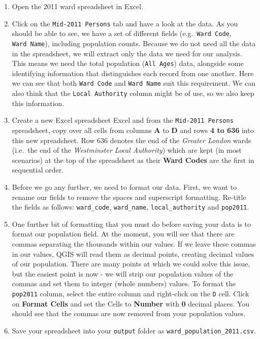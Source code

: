 \documentclass[
]{book}
\providecommand{\tightlist}{%
  \setlength{\itemsep}{0pt}\setlength{\parskip}{0pt}}
\begin{document}
\begin{enumerate}
\def\labelenumi{\arabic{enumi}.}
\tightlist
\item
  Open the 2011 ward spreadsheet in Excel.
\item
  Click on the \texttt{Mid-2011\ Persons} tab and have a look at the data. As you should be able to see, we have a set of different fields (e.g.~\texttt{Ward\ Code}, \texttt{Ward\ Name}), including population counts. Because we do not need all the data in the spreadsheet, we will extract only the data we need for our analysis. This means we need the total population (\texttt{All\ Ages}) data, alongside some identifying information that distinguishes each record from one another. Here we can see that both \texttt{Ward\ Code} and \texttt{Ward\ Name} suit this requirement. We can also think that the \texttt{Local\ Authority} column might be of use, so we also keep this information.
\item
  Create a new Excel spreadsheet Excel and from the \texttt{Mid-2011\ Persons} spreadsheet, copy over all cells from columns \textbf{A} to \textbf{D} and rows \textbf{4 to 636} into this new spreadsheet. Row 636 denotes the end of the \emph{Greater London} wards (i.e.~the end of the \emph{Westminster Local Authority}) which are kept (in most scenarios) at the top of the spreadsheet as their \textbf{Ward Codes} are the first in sequential order.
\item
  Before we go any further, we need to format our data. First, we want to rename our fields to remove the spaces and superscript formatting. Re-title the fields as follows: \texttt{ward\_code}, \texttt{ward\_name}, \texttt{local\_authority} and \texttt{pop2011}.
\item
  One further bit of formatting that you must do before saving your data is to format our population field. At the moment, you will see that there are commas separating the thousands within our values. If we leave these commas in our values, QGIS will read them as decimal points, creating decimal values of our population. There are many points at which we could solve this issue, but the easiest point is now - we will strip our population values of the commas and set them to integer (whole numbers) values. To format the \texttt{pop2011} column, select the entire column and right-click on the \texttt{D} cell. Click on \textbf{Format Cells} and set the Cells to \textbf{Number} with \textbf{0} decimal places. You should see that the commas are now removed from your population values.
\item
  Save your spreadsheet into your \texttt{output} folder as \texttt{ward\_population\_2011.csv}.
\end{enumerate}
\end{document}
